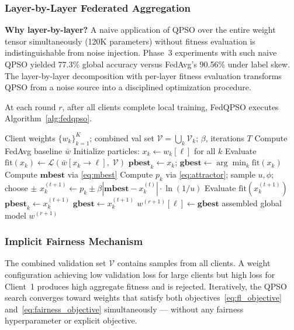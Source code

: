 \documentclass[conference]{IEEEtran}
\begin{document}
\subsubsection{Layer-by-Layer Federated Aggregation}
\textbf{Why layer-by-layer?} A naive application of QPSO over the entire
weight tensor simultaneously (120K parameters) without fitness evaluation
is indistinguishable from noise injection. Phase~3 experiments with such
naive QPSO yielded 77.3\% global accuracy versus FedAvg's 90.56\% under
label skew. The layer-by-layer decomposition with per-layer fitness evaluation
transforms QPSO from a noise source into a disciplined optimization procedure.

At each round $r$, after all clients complete local training, FedQPSO
executes Algorithm~\ref{alg:fedqpso}.

\begin{algorithm}
\caption{FedQPSO server-side aggregation (round $r$)}
\label{alg:fedqpso}
\begin{algorithmic}[1]
\REQUIRE Client weights $\{w_k\}_{k=1}^K$; combined val set
$\mathcal{V} = \bigcup_k \mathcal{V}_k$; $\beta$, iterations $T$
\STATE Compute FedAvg baseline $\bar{w}$ \hfill{}
    \STATE Initialize particles: $x_k \leftarrow w_k[\ell]$ for all $k$
    \STATE Evaluate $\mathrm{fit}(x_k) \leftarrow \mathcal{L}(\bar{w}[x_k \to \ell],\;\mathcal{V})$
    \STATE $\mathbf{pbest}_k \leftarrow x_k$;\; $\mathbf{gbest} \leftarrow \arg\min_k \mathrm{fit}(x_k)$
        \STATE Compute $\mathbf{mbest}$ via \eqref{eq:mbest}
            \STATE Compute $p_k$ via \eqref{eq:attractor}; sample $u, \phi$; choose $\pm$
            \STATE $x_k^{(t+1)} \leftarrow p_k \pm \beta|\mathbf{mbest}-x_k^{(t)}|\cdot\ln(1/u)$
            \STATE Evaluate $\mathrm{fit}(x_k^{(t+1)})$
                \STATE $\mathbf{pbest}_k \leftarrow x_k^{(t+1)}$
            \ENDIF
                \STATE $\mathbf{gbest} \leftarrow x_k^{(t+1)}$
            \ENDIF
        \ENDFOR
    \ENDFOR
    \STATE $w^{(r+1)}[\ell] \leftarrow \mathbf{gbest}$ \hfill{}
\ENDFOR
\RETURN assembled global model $w^{(r+1)}$
\end{algorithmic}
\end{algorithm}

\subsubsection{Implicit Fairness Mechanism}
The combined validation set $\mathcal{V}$ contains samples from all clients.
A weight configuration achieving low validation loss for large clients but
high loss for Client~1 produces high aggregate fitness and is rejected.
Iteratively, the QPSO search converges toward weights that satisfy both
objectives~\eqref{eq:fl_objective} and~\eqref{eq:fairness_objective}
simultaneously — without any fairness hyperparameter or explicit objective.
\end{document}
